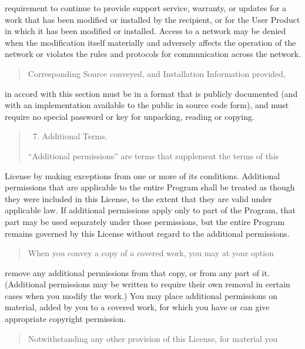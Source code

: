 \documentclass[letterpaper,10pt,english]{sphinxmanual}
\begin{document}
requirement to continue to provide support service, warranty, or updates
for a work that has been modified or installed by the recipient, or for
the User Product in which it has been modified or installed.  Access to a
network may be denied when the modification itself materially and
adversely affects the operation of the network or violates the rules and
protocols for communication across the network.
\begin{quote}

Corresponding Source conveyed, and Installation Information provided,
\end{quote}

in accord with this section must be in a format that is publicly
documented (and with an implementation available to the public in
source code form), and must require no special password or key for
unpacking, reading or copying.
\begin{quote}
\begin{enumerate}
\setcounter{enumi}{6}
\item {} 
Additional Terms.

\end{enumerate}

“Additional permissions” are terms that supplement the terms of this
\end{quote}

License by making exceptions from one or more of its conditions.
Additional permissions that are applicable to the entire Program shall
be treated as though they were included in this License, to the extent
that they are valid under applicable law.  If additional permissions
apply only to part of the Program, that part may be used separately
under those permissions, but the entire Program remains governed by
this License without regard to the additional permissions.
\begin{quote}

When you convey a copy of a covered work, you may at your option
\end{quote}

remove any additional permissions from that copy, or from any part of
it.  (Additional permissions may be written to require their own
removal in certain cases when you modify the work.)  You may place
additional permissions on material, added by you to a covered work,
for which you have or can give appropriate copyright permission.
\begin{quote}

Notwithstanding any other provision of this License, for material you
\end{quote}
\end{document}
